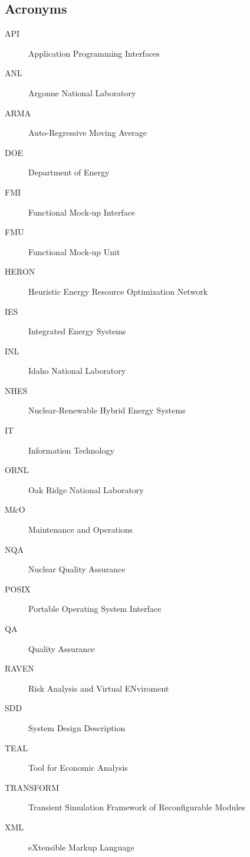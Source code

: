 \subsection{Acronyms}
\begin{description}
\item[API] Application Programming Interfaces
\item[ANL] Argonne National Laboratory
\item[ARMA] Auto-Regressive Moving Average
\item[DOE] Department of Energy
\item[FMI] Functional Mock-up Interface
\item[FMU] Functional Mock-up Unit
\item[HERON] Heuristic Energy Resource Optimization Network
\item[IES] Integrated Energy Systems
\item[INL] Idaho National Laboratory
\item[NHES] Nuclear-Renewable Hybrid Energy Systems 
\item[IT] Information Technology
\item[ORNL] Oak Ridge National Laboratory
\item[M\&O] Maintenance and Operations
\item[NQA] Nuclear Quality Assurance
\item[POSIX]  Portable Operating System Interface
\item[QA] Quality Assurance
\item[RAVEN] Risk Analysis and Virtual ENviroment
\item[SDD] System Design Description
\item[TEAL] Tool for Economic Analysis
\item[TRANSFORM]  Transient Simulation Framework of Reconfigurable Modules
\item[XML] eXtensible Markup Language 
\end{description}
